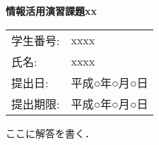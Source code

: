 \topmargin=-1.5cm
\textwidth=17cm
\textheight=25cm
\oddsidemargin=-0.5cm
\evensidemargin=-0.5cm


\begin{center}
\Large\bf 情報活用演習課題xx
\end{center}

\begin{flushright}
\begin{tabular}{ll}
学生番号: & xxxx \\
氏名:     & xxxx \\
提出日:   & 平成○年○月○日 \\
提出期限: & 平成○年○月○日 \\
\end{tabular}
\end{flushright}

ここに解答を書く．




